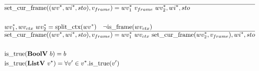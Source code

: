 \begin{align*}
  \hline
  &\setcurframe((\seq{wv}, \seq{wi}, sto), v_{frame})
  =
  \seq{wv_1} ~ v_{frame} ~ \seq{wv_2}, \seq{wi}, sto \\
%
\newline \\
  &\seq{wv_1}, wv_{ctx} ~ \seq{wv_2} = \splitctx(\seq{wv}) \quad \neg \isframe(wv_{ctx}) \\
  \hline
  &\setcurframe((\seq{wv}, \seq{wi}, sto), v_{frame})
  =
  \seq{wv_1} ~ wv_{ctx} ~ \setcurframe(\seq{wv_2}, v_{frame}), \seq{wi}, sto \\
%
\newline \\
  &\istrue(\boolv ~ b) = b \\
  &\istrue(\listv ~ \seq v) = \forall v' \in \seq v. \istrue (v') \\
\end{align*}





